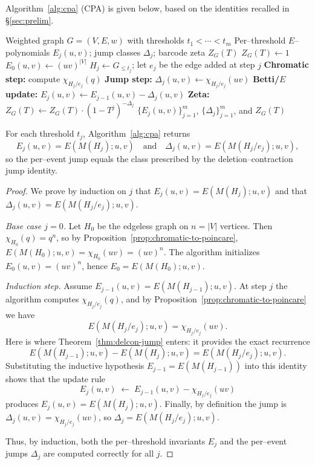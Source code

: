 \documentclass[runningheads]{llncs}
\begin{document}
Algorithm~\ref{alg:cpa} (CPA) is given below, based on the identities recalled in \S\ref{sec:prelim}.
\begin{algorithm}[!h]
  \caption{Algorithm CPA: Event–Driven Motivic Persistence on Graphs}
  \label{alg:cpa}
  \begin{algorithmic}[1]
    \Require Weighted graph $G=(V,E,w)$ with thresholds $t_1<\cdots<t_m$
    \Ensure Per–threshold $E$–polynomials $E_j(u,v)$; jump classes $\Delta_j$; barcode zeta $Z_G(T)$
    \State $Z_G(T)\gets 1$ 
    \State $E_0(u,v)\gets (uv)^{|V|}$ 
     
      \State $H_j\gets G_{\le t_j}$; let $e_j$ be the edge added at step $j$
      \State \textbf{Chromatic step:} compute $\chi_{H_j/e_j}(q)$ 
      \State \textbf{Jump step:} $\Delta_j(u,v)\gets \chi_{H_j/e_j}(uv)$
      \State \textbf{Betti/$E$ update:} $E_j(u,v)\gets E_{j-1}(u,v)-\Delta_j(u,v)$
      \State \textbf{Zeta:} $Z_G(T)\gets Z_G(T)\cdot (1-T^j)^{-\Delta_j}$
    \EndFor
    \State \Return $\{E_j(u,v)\}_{j=1}^m$, $\{\Delta_j\}_{j=1}^m$, and $Z_G(T)$
  \end{algorithmic}
\end{algorithm}




\begin{theorem}[Correctness]
For each threshold $t_j$, Algorithm~\ref{alg:cpa} returns
\[
E_j(u,v)=E\!\left(M(H_j);u,v\right)
\quad\text{and}\quad
\Delta_j(u,v)=E\!\left(M(H_j/e_j);u,v\right),
\]
so the per–event jump equals the class prescribed by the
deletion–contraction jump identity.
\end{theorem}

\begin{proof}
We prove by induction on $j$ that $E_j(u,v)=E(M(H_j);u,v)$ and that
$\Delta_j(u,v)=E(M(H_j/e_j);u,v)$.

\emph{Base case $j=0$.} Let $H_0$ be the edgeless graph on $n=|V|$ vertices.
Then $\chi_{H_0}(q)=q^n$, so by Proposition~\ref{prop:chromatic-to-poincare},
$E(M(H_0);u,v)=\chi_{H_0}(uv)=(uv)^n$. The algorithm initializes
$E_0(u,v)=(uv)^n$, hence $E_0=E(M(H_0);u,v)$.

\emph{Induction step.} Assume $E_{j-1}(u,v)=E(M(H_{j-1});u,v)$.
At step $j$ the algorithm computes $\chi_{H_j/e_j}(q)$, and by
Proposition~\ref{prop:chromatic-to-poincare} we have
\[
E(M(H_j/e_j);u,v)=\chi_{H_j/e_j}(uv).
\]
Here is where Theorem~\ref{thm:delcon-jump} enters: it provides the exact
recurrence
\[
E(M(H_{j-1});u,v)-E(M(H_j);u,v)=E(M(H_j/e_j);u,v).
\]
Substituting the inductive hypothesis $E_{j-1}=E(M(H_{j-1}))$ into this
identity shows that the update rule
\[
E_j(u,v)\;\gets\;E_{j-1}(u,v)-\chi_{H_j/e_j}(uv)
\]
produces $E_j(u,v)=E(M(H_j);u,v)$.
Finally, by definition the jump is $\Delta_j(u,v)=\chi_{H_j/e_j}(uv)$,
so $\Delta_j=E(M(H_j/e_j);u,v)$.

Thus, by induction, both the per–threshold invariants $E_j$ and the per–event
jumps $\Delta_j$ are computed correctly for all $j$.
\end{proof}
\end{document}
